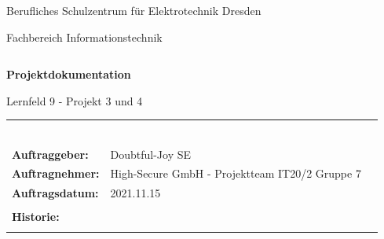 \documentclass[a4paper,
    11pt,
    headings=small,
    ngerman,
    listof=totoc,
    numbers=noenddot]{scrreprt}[2021/11/13]
\begin{document}
\pagestyle{empty}


\begin{center}
  \Large{Berufliches Schulzentrum für Elektrotechnik Dresden}\\
\end{center}

\begin{center}
  \Large{Fachbereich Informationstechnik}
\end{center}
\begin{verbatim}

\end{verbatim}
\begin{center}
  \textbf{\LARGE{Projektdokumentation}}
\end{center}

\begin{center}
  \Large{Lernfeld 9 - Projekt 3 und 4}
\end{center}

\vspace{\fill}

\begin{flushleft}
  \begin{tabular}{lll}
                            &                                                & \\
                            &                                                & \\
                            &                                                & \\
                            &                                                & \\
                            &                                                & \\
                            &                                                & \\
    \textbf{Auftraggeber:}  & Doubtful-Joy SE                                & \\
    \textbf{Auftragnehmer:} & High-Secure GmbH - Projektteam IT20/2 Gruppe 7 & \\
    \textbf{Auftragsdatum:} & 2021.11.15                                     & \\
                            &                                                & \\
    \textbf{Historie:}
                            &                                                  \\
                            &                                                & \\
  \end{tabular}
\end{flushleft}
\end{document}
